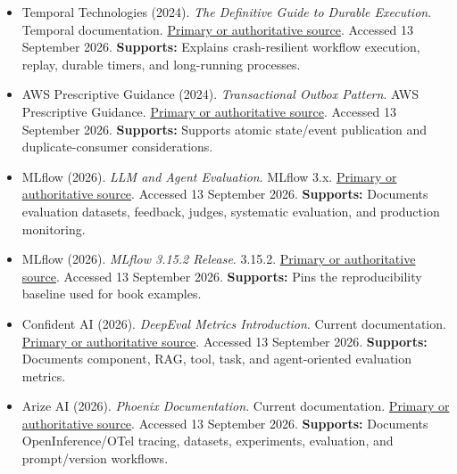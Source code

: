 \begin{itemize}

\item {}\textbf{} Temporal Technologies (2024). \emph{The Definitive Guide to Durable Execution}. Temporal documentation. \href{\detokenize{https://temporal.io/blog/what-is-durable-execution}}{Primary or authoritative source}. Accessed 13 September 2026. \textbf{Supports:} Explains crash-resilient workflow execution, replay, durable timers, and long-running processes.

\item {}\textbf{} AWS Prescriptive Guidance (2024). \emph{Transactional Outbox Pattern}. AWS Prescriptive Guidance. \href{\detokenize{https://docs.aws.amazon.com/prescriptive-guidance/latest/cloud-design-patterns/transactional-outbox.html}}{Primary or authoritative source}. Accessed 13 September 2026. \textbf{Supports:} Supports atomic state/event publication and duplicate-consumer considerations.

\item {}\textbf{} MLflow (2026). \emph{LLM and Agent Evaluation}. MLflow 3.x. \href{\detokenize{https://mlflow.org/docs/latest/genai/eval-monitor/}}{Primary or authoritative source}. Accessed 13 September 2026. \textbf{Supports:} Documents evaluation datasets, feedback, judges, systematic evaluation, and production monitoring.

\item {}\textbf{} MLflow (2026). \emph{MLflow 3.15.2 Release}. 3.15.2. \href{\detokenize{https://mlflow.org/releases/3.15.2}}{Primary or authoritative source}. Accessed 13 September 2026. \textbf{Supports:} Pins the reproducibility baseline used for book examples.

\item {}\textbf{} Confident AI (2026). \emph{DeepEval Metrics Introduction}. Current documentation. \href{\detokenize{https://deepeval.com/docs/metrics-introduction}}{Primary or authoritative source}. Accessed 13 September 2026. \textbf{Supports:} Documents component, RAG, tool, task, and agent-oriented evaluation metrics.

\item {}\textbf{} Arize AI (2026). \emph{Phoenix Documentation}. Current documentation. \href{\detokenize{https://arize.com/docs/phoenix}}{Primary or authoritative source}. Accessed 13 September 2026. \textbf{Supports:} Documents OpenInference/OTel tracing, datasets, experiments, evaluation, and prompt/version workflows.


\end{itemize}
